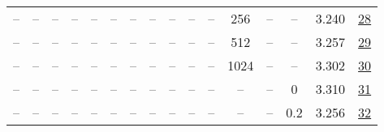 \begin{table}[H]
\begin{tabular}{cccccccccccccccc}
-- & -- & -- & -- & -- & -- & -- & -- & -- & -- & -- & 256 & -- & -- & 3.240 & \href{https://wandb.ai/stanford-mercury/optimizer-scaling/runs/sweep-130m-21B-muon284dcblr0.008-wd0.1-minlr0-warmup0-b10.8-b20.-103e2d}{28} \\
-- & -- & -- & -- & -- & -- & -- & -- & -- & -- & -- & 512 & -- & -- & 3.257 & \href{https://wandb.ai/stanford-mercury/optimizer-scaling/runs/sweep-130m-21B-muonfc6df6lr0.008-wd0.1-minlr0-warmup0-b10.8-b20.-e8f442}{29} \\
-- & -- & -- & -- & -- & -- & -- & -- & -- & -- & -- & 1024 & -- & -- & 3.302 & \href{https://wandb.ai/stanford-mercury/optimizer-scaling/runs/sweep-130m-21B-muonc12bf0lr0.008-wd0.1-minlr0-warmup0-b10.8-b20.-3a6695}{30} \\
-- & -- & -- & -- & -- & -- & -- & -- & -- & -- & -- & -- & -- & 0 & 3.310 & \href{https://wandb.ai/stanford-mercury/optimizer-scaling/runs/sweep-130m-21B-muon20f1celr0.008-wd0-minlr0-warmup0-b10.8-b20.98-0351b6}{31} \\
-- & -- & -- & -- & -- & -- & -- & -- & -- & -- & -- & -- & -- & 0.2 & 3.256 & \href{https://wandb.ai/stanford-mercury/optimizer-scaling/runs/sweep-130m-21B-muon11e37alr0.008-wd0.2-minlr0-warmup0-b10.8-b20.-9c2c15}{32} \\
\bottomrule
\end{tabular}
\end{table}

